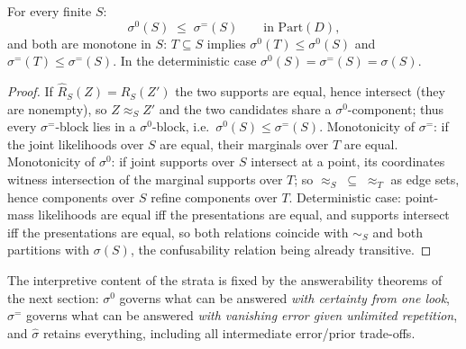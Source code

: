 \begin{thmplain}

For every finite \(S\):
\[
\sigma^{0}(S) \;\le\; \sigma^{=}(S) \qquad \text{in } \mathrm{Part}(D),
\]
and both are monotone in \(S\): \(T \subseteq S\) implies \(\sigma^{0}(T) \le \sigma^{0}(S)\) and \(\sigma^{=}(T) \le \sigma^{=}(S)\). In the deterministic case \(\sigma^{0}(S) = \sigma^{=}(S) = \sigma(S)\).
\end{thmplain}

\begin{proof}

If \(\widehat R_S(Z) = \widehat R_S(Z')\) the two supports are equal, hence intersect (they are nonempty), so \(Z \approx_S Z'\) and the two candidates share a \(\sigma^0\)-component; thus every \(\sigma^=\)-block lies in a \(\sigma^0\)-block, i.e.~\(\sigma^0(S) \le \sigma^=(S)\). Monotonicity of \(\sigma^=\): if the joint likelihoods over \(S\) are equal, their marginals over \(T\) are equal. Monotonicity of \(\sigma^0\): if joint supports over \(S\) intersect at a point, its coordinates witness intersection of the marginal supports over \(T\); so \(\approx_S\; \subseteq\; \approx_T\) as edge sets, hence components over \(S\) refine components over \(T\). Deterministic case: point-mass likelihoods are equal iff the presentations are equal, and supports intersect iff the presentations are equal, so both relations coincide with \(\sim_S\) and both partitions with \(\sigma(S)\), the confusability relation being already transitive.
\end{proof}

The interpretive content of the strata is fixed by the answerability theorems of the next section: \(\sigma^0\) governs what can be answered \emph{with certainty from one look}, \(\sigma^=\) governs what can be answered \emph{with vanishing error given unlimited repetition}, and \(\widehat\sigma\) retains everything, including all intermediate error/prior trade-offs.



